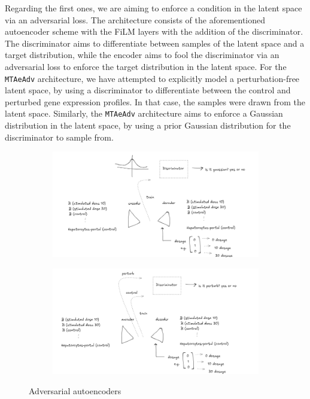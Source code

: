 \documentclass[12pt, a4paper]{article}
\begin{document}
Regarding the first ones, we are aiming to enforce a condition in the latent space via an adversarial loss. The architecture consists of the aforementioned autoencoder scheme with the FiLM layers with the addition of the discriminator. The discriminator aims to differentiate between samples of the latent space and a target distribution, while the encoder aims to fool the discriminator via an adversarial loss to enforce the target distribution in the latent space. For the  \verb|MTAeAdv| architecture, we have attempted to explicitly model a perturbation-free latent space, by using a discriminator to differentiate between the control and perturbed gene expression profiles. In that case, the samples were drawn from the latent space. Similarly, the \verb|MTAeAdv| architecture aims to enforce a Gaussian distribution in the latent space, by using a prior Gaussian distribution for the discriminator to sample from. 

\begin{figure}
    \centering
    \begin{subfigure}[t]{0.48\textwidth}
        \centering
        \includegraphics[width=\textwidth]{ae_gauss_sketch.png}
        \caption{}
        \label{}
    \end{subfigure}
    \hfill
    \begin{subfigure}[t]{0.48\textwidth}
        \centering
        \includegraphics[width=\textwidth]{ae_adv_sketch.png}
        \caption{}
        \label{}
    \end{subfigure}
    \caption{Adversarial autoencoders}
    \label{}
\end{figure}
\end{document}
